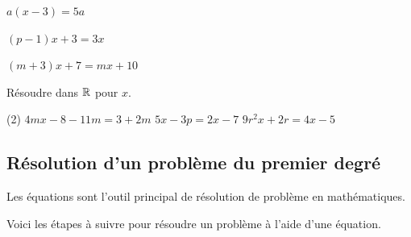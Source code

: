 \documentclass[a4paper,12pt]{article}
\begin{document}
\begin{exemple}
$a(x-3)=5a$
	\tcblower
	\vspace{6cm}

\end{exemple}

\begin{exemple}
$(p-1)x+3=3x$ 
	\tcblower
	\vspace{6cm}

\end{exemple}

\begin{exemple}
$(m+3)x+7=mx+10$
	\tcblower
	\vspace{6cm}

\end{exemple}
\begin{exercice}
	\tcblower
Résoudre dans $\mathbb{R}$ pour $x$.
\begin{tasks}(2)
	\task $4 m x-8-11 m=3+2 m$
	\task $5x-3p=2x-7$
	\task $9r^2x+2r=4x-5$
\end{tasks}
\end{exercice}

\newpage
\subsection{Résolution d'un problème du premier degré}
Les équations sont l'outil principal de résolution de problème en mathématiques. 

Voici les étapes à suivre pour résoudre un problème à l'aide d'une équation.
\end{document}
